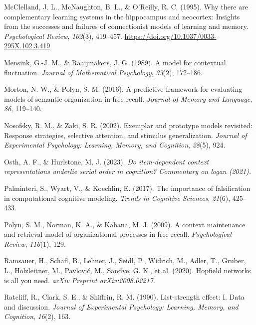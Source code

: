 \documentclass[
  man,
  floatsintext,
  longtable,
  nolmodern,
  notxfonts,
  notimes,
  draftfirst,
  colorlinks=true,linkcolor=blue,citecolor=blue,urlcolor=blue]{apa7}
\newlength{\cslhangindent}
\newenvironment{CSLReferences}[2] %
 {\begin{list}{}{%
  \setlength{\itemindent}{0pt}
  \setlength{\leftmargin}{0pt}
  \setlength{\parsep}{0pt}
  \ifodd #1
   \setlength{\leftmargin}{\cslhangindent}
   \setlength{\itemindent}{-1\cslhangindent}
  \fi
  \setlength{\itemsep}{#2\baselineskip}}}
 {\end{list}}
\begin{document}
\begin{CSLReferences}{1}{0}
McClelland, J. L., McNaughton, B. L., \& O'Reilly, R. C. (1995). Why
there are complementary learning systems in the hippocampus and
neocortex: Insights from the successes and failures of connectionist
models of learning and memory. \emph{Psychological Review},
\emph{102}(3), 419--457.
\url{https://doi.org/10.1037/0033-295X.102.3.419}

Mensink, G.-J. M., \& Raaijmakers, J. G. (1989). A model for contextual
fluctuation. \emph{Journal of Mathematical Psychology}, \emph{33}(2),
172--186.

Morton, N. W., \& Polyn, S. M. (2016). A predictive framework for
evaluating models of semantic organization in free recall. \emph{Journal
of Memory and Language}, \emph{86}, 119--140.

Nosofsky, R. M., \& Zaki, S. R. (2002). Exemplar and prototype models
revisited: Response strategies, selective attention, and stimulus
generalization. \emph{Journal of Experimental Psychology: Learning,
Memory, and Cognition}, \emph{28}(5), 924.

Osth, A. F., \& Hurlstone, M. J. (2023). \emph{Do item-dependent context
representations underlie serial order in cognition? Commentary on logan
(2021).}

Palminteri, S., Wyart, V., \& Koechlin, E. (2017). The importance of
falsification in computational cognitive modeling. \emph{Trends in
Cognitive Sciences}, \emph{21}(6), 425--433.

Polyn, S. M., Norman, K. A., \& Kahana, M. J. (2009). A context
maintenance and retrieval model of organizational processes in free
recall. \emph{Psychological Review}, \emph{116}(1), 129.

Ramsauer, H., Schäfl, B., Lehner, J., Seidl, P., Widrich, M., Adler, T.,
Gruber, L., Holzleitner, M., Pavlović, M., Sandve, G. K., et al. (2020).
Hopfield networks is all you need. \emph{arXiv Preprint
arXiv:2008.02217}.

Ratcliff, R., Clark, S. E., \& Shiffrin, R. M. (1990). List-strength
effect: I. Data and discussion. \emph{Journal of Experimental
Psychology: Learning, Memory, and Cognition}, \emph{16}(2), 163.


\end{CSLReferences}
\end{document}
